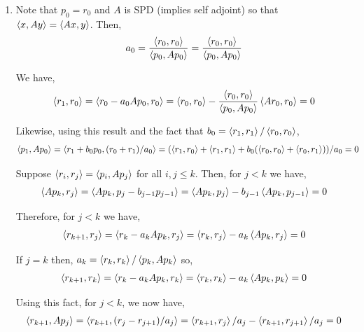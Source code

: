\documentclass[10pt]{article}
\begin{document}
\begin{solution}[Solution]

\begin{enumerate}[label=(\alph*)]
    \item 
        Note that \( p_0 = r_0 \) and \( A \) is SPD (implies self adjoint) so that \( \left\langle x,Ay \right\rangle = \left\langle Ax,y \right\rangle \). Then,
        \begin{align*}
            a_0 = \dfrac{\left\langle r_0,r_0 \right\rangle}{\left\langle  p_0, Ap_0  \right\rangle} 
            = \dfrac{\left\langle r_0,r_0 \right\rangle}{\left\langle p_0,Ap_0 \right\rangle}
        \end{align*}
        

        We have,
        \begin{align*}
            \left\langle r_1,r_0 \right\rangle  = \left\langle  r_0-a_0Ap_0 , r_0  \right\rangle
            = \left\langle  r_0,r_0  \right\rangle - \dfrac{\left\langle r_0,r_0 \right\rangle}{\left\langle p_0,Ap_0 \right\rangle} \left\langle  A r_0, r_0 \right\rangle 
            = 0
        \end{align*}


        Likewise, using this result and the fact that \( b_0 = \left\langle r_1,r_1 \right\rangle/\left\langle r_0,r_0 \right\rangle \),
        \begin{align*}
            \left\langle p_1,Ap_0 \right\rangle = \left\langle r_1+b_0p_0,(r_0+r_1)/a_0 \right\rangle
            &= (\left\langle r_1,r_0 \right\rangle + \left\langle r_1,r_1 \right\rangle + b_0(\left\langle r_0,r_0 \right\rangle + \left\langle r_0,r_1 \right\rangle))/a_0
            = 0
        \end{align*}
        

        Suppose \( \left\langle r_i,r_j \right\rangle = \left\langle p_i,A p_j  \right\rangle \) for all \( i,j \leq k \). 
        Then, for \( j < k \) we have,
        \begin{align*}
            \left\langle A p_k,r_j \right\rangle = \left\langle A p_k, p_j - b_{j-1} p_{j-1} \right\rangle
            = \left\langle A p_k, p_j \right\rangle - b_{j-1} \left\langle A p_k, p_{j-1} \right\rangle
            = 0
        \end{align*}
        
        Therefore, for \( j<k \) we have,
        \begin{align*}
            \left\langle r_{k+1},r_j \right\rangle = \left\langle  r_k-a_kAp_k , r_j \right\rangle = \left\langle r_k,r_j \right\rangle - a_k \left\langle Ap_k,r_j \right\rangle = 0
        \end{align*}
       
        If \( j = k \) then, \( a_k = \left\langle r_k,r_k \right\rangle / \left\langle p_k,Ap_k \right\rangle \) so,
        \begin{align*}
            \left\langle r_{k+1},r_k \right\rangle = \left\langle r_k-a_kAp_k, r_k \right\rangle = \left\langle r_k,r_k \right\rangle - a_k\left\langle A p_k,p_k \right\rangle = 0
        \end{align*}
        


        Using this fact, for \( j < k \), we now have,
        \begin{align*}
            \left\langle r_{k+1},Ap_j \right\rangle 
            = \left\langle r_{k+1}, (r_j-r_{j+1})/a_j \right\rangle
            = \left\langle r_{k+1},r_j \right\rangle / a_j - \left\langle r_{k+1},r_{j+1} \right\rangle/a_j
            = 0
        \end{align*}
        

\end{enumerate}
\end{solution}
\end{document}
